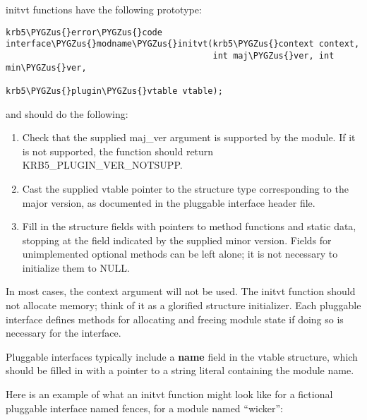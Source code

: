\documentclass[letterpaper,10pt,english]{sphinxmanual}
\def\PYGZus{\char`\_}
\begin{document}
initvt functions have the following prototype:

\begin{Verbatim}[commandchars=\\\{\}]
krb5\PYGZus{}error\PYGZus{}code interface\PYGZus{}modname\PYGZus{}initvt(krb5\PYGZus{}context context,
                                         int maj\PYGZus{}ver, int min\PYGZus{}ver,
                                         krb5\PYGZus{}plugin\PYGZus{}vtable vtable);
\end{Verbatim}

and should do the following:
\begin{enumerate}
\item {} 
Check that the supplied maj\_ver argument is supported by the
module.  If it is not supported, the function should return
KRB5\_PLUGIN\_VER\_NOTSUPP.

\item {} 
Cast the supplied vtable pointer to the structure type
corresponding to the major version, as documented in the pluggable
interface header file.

\item {} 
Fill in the structure fields with pointers to method functions and
static data, stopping at the field indicated by the supplied minor
version.  Fields for unimplemented optional methods can be left
alone; it is not necessary to initialize them to NULL.

\end{enumerate}

In most cases, the context argument will not be used.  The initvt
function should not allocate memory; think of it as a glorified
structure initializer.  Each pluggable interface defines methods for
allocating and freeing module state if doing so is necessary for the
interface.

Pluggable interfaces typically include a \textbf{name} field in the vtable
structure, which should be filled in with a pointer to a string
literal containing the module name.

Here is an example of what an initvt function might look like for a
fictional pluggable interface named fences, for a module named
``wicker'':
\end{document}
